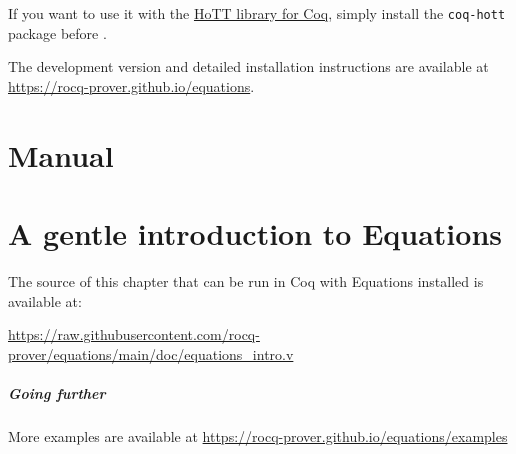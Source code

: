 \documentclass{report}
\begin{document}
If you want to use it with the \href{https://github.com/HoTT/HoTT}{HoTT library for Coq}, simply install the 
\texttt{coq-hott} package before \Equations.

The development version and detailed installation instructions are available at
\url{https://rocq-prover.github.io/equations}.

\doparttoc
\parttoc
\tableofcontents

\chapter{Manual}
\label{cha:manual}


\chapter{A gentle introduction to Equations}
\label{cha:gentle-intro}

The source of this chapter that can be run in Coq with Equations
installed is available at:

\url{https://raw.githubusercontent.com/rocq-prover/equations/main/doc/equations_intro.v}



\paragraph{Going further}

More examples are available at \url{https://rocq-prover.github.io/equations/examples}


\label{cha:bibliography}

\end{document}
